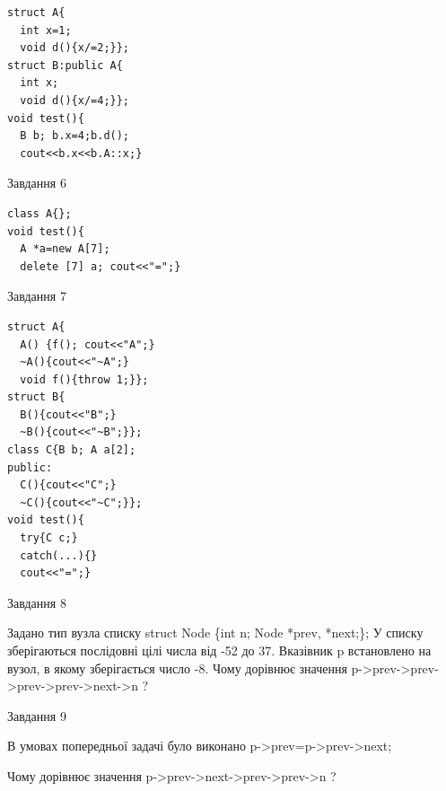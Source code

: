 \documentclass[12pt, ukrainian]{article}
\begin{document}
{{{{{{{\begin{minipage}[t]{7cm}
\begin{verbatim}
struct A{
  int x=1;
  void d(){x/=2;}};
struct B:public A{
  int x;
  void d(){x/=4;}};
void test(){
  B b; b.x=4;b.d();
  cout<<b.x<<b.A::x;}
\end{verbatim}            


               
{\begin{center}Завдання {6}\end{center}}
\vspace{-6mm}

\begin{verbatim}
class A{};
void test(){
  A *a=new A[7]; 
  delete [7] a; cout<<"=";}
\end{verbatim}            


               
{\begin{center}Завдання {7}\end{center}}
\vspace{-6mm}

\begin{verbatim}
struct A{
  A() {f(); cout<<"A";}
  ~A(){cout<<"~A";} 
  void f(){throw 1;}};
struct B{
  B(){cout<<"B";}
  ~B(){cout<<"~B";}};
class C{B b; A a[2];
public:
  C(){cout<<"C";}
  ~C(){cout<<"~C";}};
void test(){
  try{C c;} 
  catch(...){} 
  cout<<"=";}
\end{verbatim}            


\end{minipage}
               
{\begin{center}Завдання {8}\end{center}}
\vspace{-6mm}
Задано тип вузла списку
struct Node \{int n; Node *prev, *next;\};
У списку зберігаються послідовні цілі числа від -52 до 37. Вказівник p встановлено на вузол, в якому зберігається число -8.
Чому дорівнює значення p->prev->prev->prev->prev->next->n ?\par

               
{\begin{center}Завдання {9}\end{center}}
\vspace{-6mm}
В умовах попередньої задачі було виконано p->prev=p->prev->next;

Чому дорівнює значення p->prev->next->prev->prev->n ?\par

\newpage
               
}}}}}}}
\end{document}
